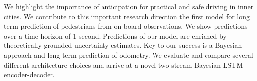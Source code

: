 We highlight the importance of anticipation for practical and safe driving  in inner cities. We contribute to this important research direction the first model for long term prediction of pedestrians from on-board observations. We show  predictions over a time horizon of 1 second. Predictions of our model are enriched by theoretically grounded uncertainty estimates. Key to our success is a Bayesian approach and long term prediction of odometry. We evaluate and compare several different architecture choices and arrive at a novel two-stream Bayesian LSTM encoder-decoder. 